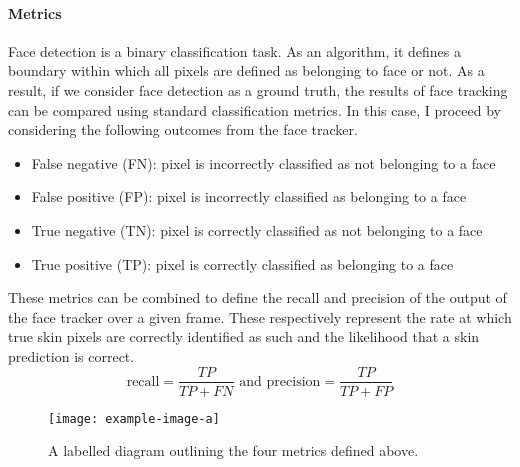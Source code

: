 \paragraph{Metrics}
Face detection is a binary classification task. As an algorithm, it defines a boundary within which all pixels are defined as belonging to face or not.
As a result, if we consider face detection as a ground truth, the results of face tracking can be compared using standard classification metrics. In this case, I proceed by considering the following outcomes from the face tracker.
\begin{itemize}
   \item False negative (FN): pixel is incorrectly classified as not belonging to a face
   \item False positive (FP): pixel is incorrectly classified as belonging to a face
   \item True negative (TN): pixel is correctly classified as not belonging to a face 
   \item True positive (TP): pixel is correctly classified as belonging to a face 
\end{itemize}
These metrics can be combined to define the recall and precision of the output of the face tracker over a given frame. These respectively represent the rate at which true skin pixels are correctly identified as such and the likelihood that a skin prediction is correct.
\begin{equation*}
    \mathrm{recall} = \frac{TP}{TP + FN} \text{ and } \mathrm{precision} = \frac{TP}{TP+FP}
\end{equation*}
\begin{figure}[H]
    \centering
    \texttt{[image: example-image-a]}
   \caption{A labelled diagram outlining the four metrics defined above.} 
\end{figure}
\noindent
